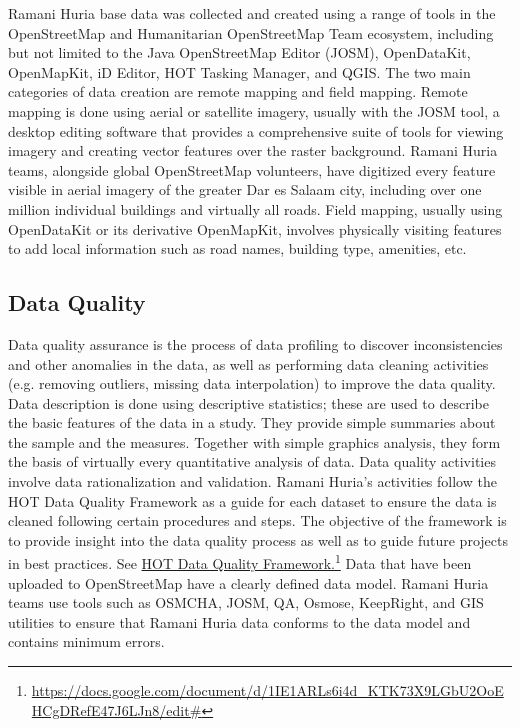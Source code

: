 \documentclass[a4paper,12pt,twoside]{article}
\begin{document}
\begin{multicols}{2}
Ramani Huria base data was collected and created using a range of tools in the OpenStreetMap and Humanitarian OpenStreetMap Team ecosystem, including but not limited to the Java OpenStreetMap Editor (JOSM), OpenDataKit, OpenMapKit, iD Editor, HOT Tasking Manager, and QGIS. 
The two main categories of data creation are remote mapping and field mapping. Remote mapping is done using aerial or satellite imagery, usually with the JOSM tool, a desktop editing software that provides a comprehensive suite of tools for viewing imagery and creating vector features over the raster background. Ramani Huria teams, alongside global OpenStreetMap volunteers, have digitized every feature visible in aerial imagery of the greater Dar es Salaam city, including over one million individual buildings and virtually all roads.
Field mapping, usually using OpenDataKit or its derivative OpenMapKit, involves physically visiting features to add local information such as road names, building type, amenities, etc.
\end{multicols}
\subsection{Data Quality}
\begin{multicols}{2}
Data quality assurance is the process of data profiling to discover inconsistencies and other anomalies in the data, as well as performing data cleaning activities (e.g. removing outliers, missing data interpolation) to improve the data quality. Data description is done using descriptive statistics; these are used to describe the basic features of the data in a study. They provide simple summaries about the sample and the measures. Together with simple graphics analysis, they form the basis of virtually every quantitative analysis of data.
Data quality activities involve data rationalization and validation. Ramani Huria's activities follow the HOT Data Quality Framework as a guide for each dataset to ensure the data is cleaned following certain procedures and steps. The objective of the framework is to provide insight into the data quality process as well as to guide future projects in best practices. See \href{https://docs.google.com/document/d/1IE1ARLs6i4d_KTK73X9LGbU2OoEHCgDRefE47J6LJn8/edit#}{HOT Data Quality Framework.}\footnote{\url{https://docs.google.com/document/d/1IE1ARLs6i4d_KTK73X9LGbU2OoEHCgDRefE47J6LJn8/edit#}}
Data that have been uploaded to OpenStreetMap have a clearly defined data model. Ramani Huria teams use tools such as OSMCHA, JOSM, QA, Osmose, KeepRight, and GIS utilities to ensure that Ramani Huria data conforms to the data model and contains minimum errors.
\end{multicols}
\end{document}
